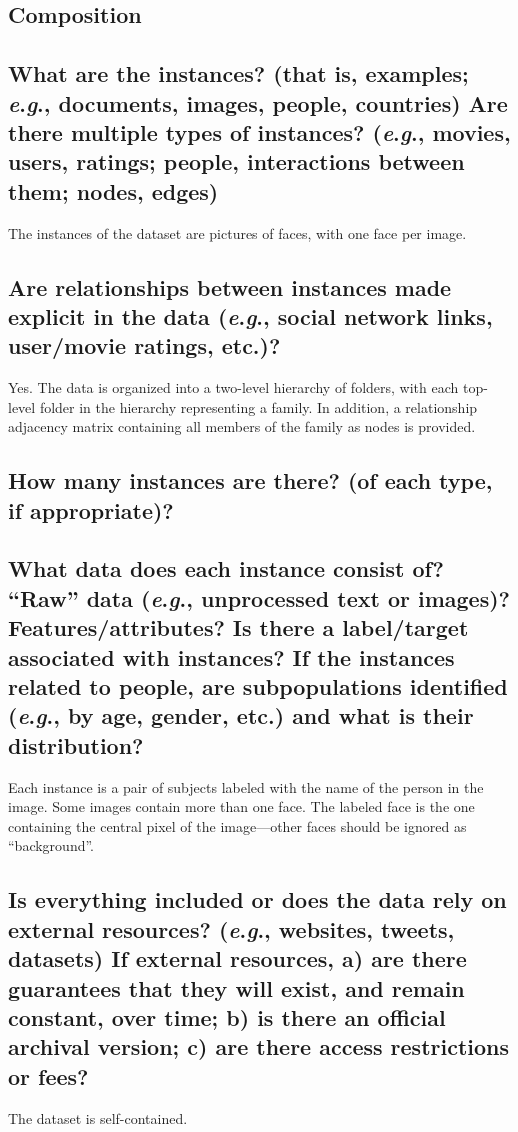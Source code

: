 \documentclass[a4paper,9pt]{extarticle}
\newcommand{\eg}{\textit{e}.\textit{g}., }
\begin{document}
\begin{multicols}{2}
\section*{Composition}
\subsection*{What are the instances? (that is, examples; \eg documents, images, people, countries) Are there multiple types of instances? (\eg movies, users, ratings; people, interactions between them; nodes, edges)}
\noindent
{\color{red} The instances of the dataset are pictures of faces, with one face per image.} 

\subsection*{Are relationships between instances made explicit in the data (\eg social network links, user/movie ratings, etc.)?}
\noindent
{\color{red} Yes. The data is organized into a two-level hierarchy of folders, with each top-level folder in the hierarchy representing a family. In addition, a relationship adjacency matrix containing all members of the family as nodes is provided.} 

\subsection*{How many instances are there? (of each type, if appropriate)?}
\noindent

\subsection*{What data does each instance consist of? “Raw” data (\eg unprocessed text or images)? Features/attributes? Is there a label/target associated with instances? If the instances related to people, are subpopulations identified (\eg by age, gender, etc.) and what is their distribution?}
\noindent Each instance is a pair of subjects labeled with the name of the
person in the image. Some images contain more than one face.
The labeled face is the one containing the central pixel of the
image—other faces should be ignored as “background”.

\subsection*{Is everything included or does the data rely on external resources?
(\eg websites, tweets, datasets) If external resources, a) are there guarantees that they will exist, and remain constant, over time; b) is there an official archival version; c) are there access restrictions or fees?}
\noindent The dataset is self-contained.


\end{multicols}
\end{document}
